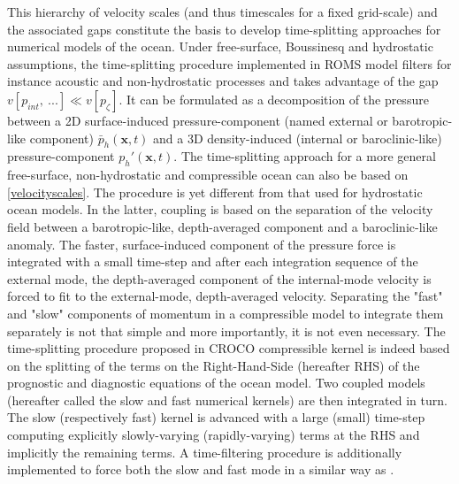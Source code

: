 This hierarchy of velocity scales (and thus timescales for a fixed grid-scale) and the associated gaps constitute the basis to develop time-splitting approaches for numerical models of the ocean.
Under free-surface, Boussinesq and hydrostatic assumptions, the time-splitting procedure implemented in ROMS model \citep{shchepetkin_regional_2005} filters for instance acoustic and non-hydrostatic processes and takes advantage of the gap $v[p_{int},\ ...] \ll v[p_\zeta]$. It can be formulated as a decomposition of the pressure between a 2D surface-induced pressure-component (named external or barotropic-like component) $\bar{p}_h(\mathbf{x},t)$ and a 3D density-induced (internal or baroclinic-like) pressure-component $p_h'(\mathbf{x},t)$. 
The time-splitting approach for a more general free-surface, non-hydrostatic and compressible ocean can also be based on \ref{velocityscales}. The procedure is yet different from that used for hydrostatic ocean models. In the latter, coupling is based on the separation of the velocity field between a barotropic-like, depth-averaged component and a baroclinic-like anomaly. The faster, surface-induced component of the pressure force is integrated with a small time-step and after each integration sequence of the external mode, the depth-averaged component of the internal-mode velocity is forced to fit to the external-mode, depth-averaged velocity. Separating the "fast" and "slow" components of momentum in a compressible model to integrate them separately is not that simple and more importantly, it is not even necessary. The time-splitting procedure proposed in CROCO compressible kernel is indeed based on the splitting of the terms on the Right-Hand-Side (hereafter RHS) of the prognostic and diagnostic equations of the ocean model. Two coupled models (hereafter called the slow and fast numerical kernels) are then integrated in turn. The slow (respectively fast) kernel is advanced with a large (small) time-step computing explicitly slowly-varying (rapidly-varying) terms at the RHS and implicitly the remaining terms. A time-filtering procedure is additionally implemented to force both the slow and fast mode in a similar way as \citet{shchepetkin_regional_2005}.


